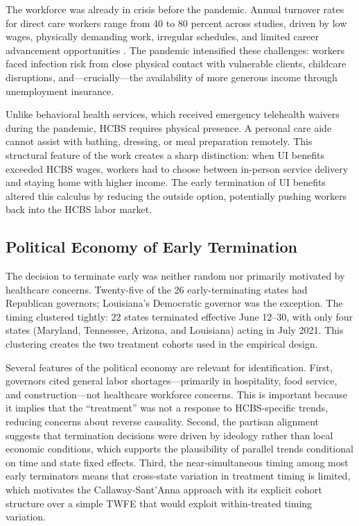 \documentclass[12pt]{article}
\begin{document}
The workforce was already in crisis before the pandemic. Annual turnover rates for direct care workers range from 40 to 80 percent across studies, driven by low wages, physically demanding work, irregular schedules, and limited career advancement opportunities \citep{scales2020}. The pandemic intensified these challenges: workers faced infection risk from close physical contact with vulnerable clients, childcare disruptions, and---crucially---the availability of more generous income through unemployment insurance.

Unlike behavioral health services, which received emergency telehealth waivers during the pandemic, HCBS requires physical presence. A personal care aide cannot assist with bathing, dressing, or meal preparation remotely. This structural feature of the work creates a sharp distinction: when UI benefits exceeded HCBS wages, workers had to choose between in-person service delivery and staying home with higher income. The early termination of UI benefits altered this calculus by reducing the outside option, potentially pushing workers back into the HCBS labor market.

\subsection{Political Economy of Early Termination}

The decision to terminate early was neither random nor primarily motivated by healthcare concerns. Twenty-five of the 26 early-terminating states had Republican governors; Louisiana's Democratic governor was the exception. The timing clustered tightly: 22 states terminated effective June 12--30, with only four states (Maryland, Tennessee, Arizona, and Louisiana) acting in July 2021. This clustering creates the two treatment cohorts used in the empirical design.

Several features of the political economy are relevant for identification. First, governors cited general labor shortages---primarily in hospitality, food service, and construction---not healthcare workforce concerns. This is important because it implies that the ``treatment'' was not a response to HCBS-specific trends, reducing concerns about reverse causality. Second, the partisan alignment suggests that termination decisions were driven by ideology rather than local economic conditions, which supports the plausibility of parallel trends conditional on time and state fixed effects. Third, the near-simultaneous timing among most early terminators means that cross-state variation in treatment timing is limited, which motivates the Callaway-Sant'Anna approach with its explicit cohort structure over a simple TWFE that would exploit within-treated timing variation.
\end{document}
